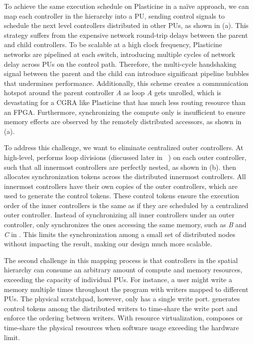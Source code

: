 To achieve the same execution schedule on Plasticine in a na\"ive approach, 
we can map each controller in the hierarchy into a PU, sending control signals to schedule the next level controllers distributed in other PUs, as shown in  (a).
This strategy suffers from the expensive network round-trip delays between the parent and child controllers.
To be scalable at a high clock frequency, Plasticine networks are pipelined at each switch,
introducing multiple cycles of network delay across PUs on the control path.
Therefore, the multi-cycle handshaking signal between the parent and the child can introduce significant pipeline bubbles
that undermines performance.
Additionally, this scheme creates a communication hotspot around the parent controller \emph{A} as
loop \emph{A} gets unrolled, which is devastating for a CGRA
like Plasticine that has much less routing resource than an FPGA.
Furthermore, synchronizing the compute only is insufficient to ensure memory effects are observed by
the remotely distributed accessors, as shown in  (a).

To address this challenge, we want to eliminate centralized outer controllers.
At high-level, \name performs loop divisions (discussed later in ~) on each outer controller, such that
all innermost controllers are perfectly nested, as shown in  (b).
\name then allocates synchronization tokens across the distributed innermost controllers.
All innermost controllers have their own copies of the outer controllers, which are used to
generate the control tokens.
These control tokens ensure the execution order of the inner controllers is the same as if they are
scheduled by a centralized outer controller. Instead of synchronizing all inner controllers under an outer controller, \name only synchronizes the ones accessing the same memory, such as \emph{B} and
\emph{C} in . This limits the synchronization among a small set of
distributed nodes without impacting the result, 
making our design much more scalable.

The second challenge in this mapping process is that controllers in the spatial hierarchy
can consume an arbitrary amount of compute and memory resources, exceeding the capacity of individual
PUs. For instance, a user might write a memory multiple times throughout the program with writers mapped to different PUs. The physical scratchpad, however, only has a single write
port. 
\name generates control tokens among the distributed writers to time-share the write port and enforce the ordering between writers.
With resource virtualization, \name composes or time-share the physical resources when software usage exceeding the hardware limit.

